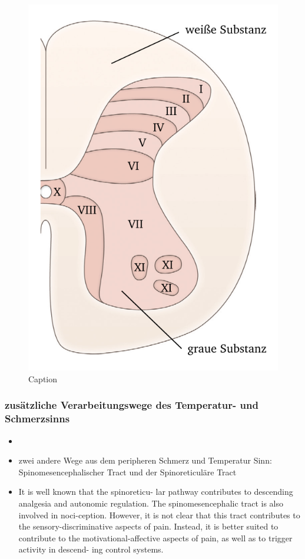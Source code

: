 \documentclass[12pt,a4paper,pdftex]{article}
\begin{document}
\begin{figure}
        \centering
        \includegraphics{pictures/somatosensory/graymatter2.png}
        \caption{Caption}
        \label{fig:graymatter}
    \end{figure}
    
\subsubsection*{zusätzliche Verarbeitungswege des Temperatur- und Schmerzsinns}

\begin{itemize}
    \item \item zwei andere Wege aus dem peripheren Schmerz und Temperatur Sinn: Spinomesencephalischer Tract und der Spinoreticuläre Tract
    \item It is well known that the spinoreticu-
    lar pathway contributes to descending analgesia and
    autonomic regulation. The spinomesencephalic tract is also involved in noci-ception. However, it is not clear that this tract contributes
    to the sensory-discriminative aspects of pain. Instead, it
    is better suited to contribute to the motivational-affective
    aspects of pain, as well as to trigger activity in descend-
    ing control systems. \cite{paxinos2014rat}
\end{itemize}
\end{document}
